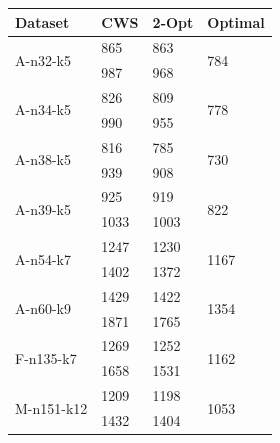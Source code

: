 \begin{table}[h!]
    \centering
    \begin{threeparttable}
    \footnotesize
        \begin{tabularx}{0.40\textwidth}{ X X X X }
            \toprule
            \textbf{Dataset} & \textbf{CWS} & \textbf{2-Opt} & \textbf{Optimal} \\ [0.5ex]
            \midrule
            \multirow{2}{*}{A-n32-k5}   & 865\tnote{1}   & 863\tnote{1}   & \multirow{2}{*}{784}  \\ [0.5ex]
                                        & 987\tnote{2}   & 968\tnote{2}   &                       \\ [0.5ex]
            \midrule
            \multirow{2}{*}{A-n34-k5}   & 826   & 809   & \multirow{2}{*}{778}  \\ [0.5ex]
                                        & 990   & 955   &                       \\ [0.5ex]
            \midrule
            \multirow{2}{*}{A-n38-k5}   & 816   & 785   & \multirow{2}{*}{730}  \\ [0.5ex]
                                        & 939   & 908   &                       \\ [0.5ex]
            \midrule
            \multirow{2}{*}{A-n39-k5}   & 925   & 919   & \multirow{2}{*}{822}  \\ [0.5ex]
                                        & 1033  & 1003  &                       \\ [0.5ex]
            \midrule
            \multirow{2}{*}{A-n54-k7}   & 1247  & 1230  & \multirow{2}{*}{1167} \\ [0.5ex]
                                        & 1402  & 1372  &                       \\ [0.5ex]
            \midrule
            \multirow{2}{*}{A-n60-k9}   & 1429  & 1422  & \multirow{2}{*}{1354} \\ [0.5ex]
                                        & 1871  & 1765  &                       \\ [0.5ex]
            \midrule
            \multirow{2}{*}{F-n135-k7}  & 1269  & 1252  & \multirow{2}{*}{1162} \\ [0.5ex]
                                        & 1658  & 1531  &                       \\ [0.5ex]
            \midrule
            \multirow{2}{*}{M-n151-k12} & 1209  & 1198  & \multirow{2}{*}{1053} \\ [0.5ex]
                                        & 1432  & 1404  &                       \\ [0.5ex]

\end{tabularx}
\end{threeparttable}
\end{table}
